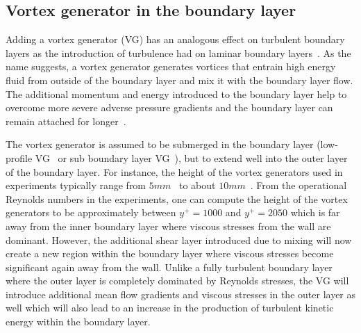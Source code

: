 
\subsection{Vortex generator in the boundary layer}\label{ssec:mixingtheory}

Adding a vortex generator (VG) has an analogous effect on turbulent boundary layers as the introduction of turbulence had on laminar boundary layers~\cite{Schubauer1960}. As the name suggests, a vortex generator generates vortices that entrain high energy fluid from outside of the boundary layer and mix it with the boundary layer flow. The additional momentum and energy introduced to the boundary layer help to overcome more severe adverse pressure gradients and the boundary layer can remain attached for longer~\cite{Schubauer1960}.

The vortex generator is assumed to be submerged in the boundary layer (low-profile VG~\cite{lin2002review} or sub boundary layer VG~\cite{Baldacchino_VG}), but to extend well into the outer layer of the boundary layer. For instance, the height of the vortex generators used in experiments typically range from $5mm$~\cite{WindtunnelDTUold} to about $10mm$~\cite{Flatplateexp2004}. From the operational Reynolds numbers in the experiments, one can compute the height of the vortex generators to be approximately between $y^+ = 1000$ and $y^+ = 2050$ which is far away from the inner boundary layer where viscous stresses from the wall are dominant. However, the additional shear layer introduced due to mixing will now create a new region within the boundary layer where viscous stresses become significant again away from the wall. Unlike a fully turbulent boundary layer where the outer layer is completely dominated by Reynolds stresses, the VG will introduce additional mean flow gradients and viscous stresses in the outer layer as well which will also lead to an increase in the production of turbulent kinetic energy within the boundary layer. 

